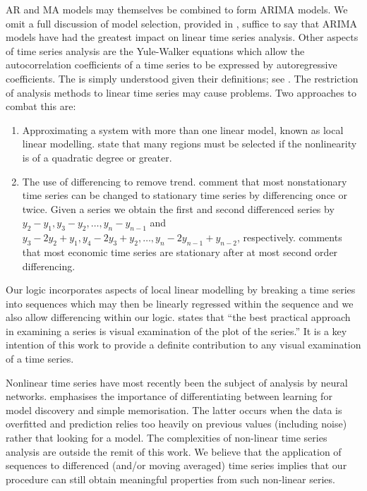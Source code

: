 \medskip

AR and MA models may themselves be combined to form ARIMA models.
We omit a full discussion of model selection,
provided in
\cite{ko90,end95}, suffice to say that ARIMA models have had the
greatest impact on linear time series analysis. Other aspects of time
series analysis are the Yule-Walker equations which allow the
autocorrelation coefficients of a time series to be expressed by
autoregressive coefficients. The is simply understood given their
definitions; see \cite{ko90}. The restriction of analysis methods to
linear time series may cause problems. Two approaches to combat this
are:
\begin{enumerate}
\item Approximating a system with more than one linear model, known as
local linear modelling. \cite{wg94} state that many regions must be
selected if the nonlinearity is of a quadratic degree or greater.
\item The use of differencing to remove trend. \cite{naze88,end95}
comment that most nonstationary time series can be changed to
stationary time series by differencing once or twice. Given a series
 we obtain the first and second differenced series by 
$y_2 - y_1, y_3 - y_2, \ldots, y_n - y_{n-1}$ and 
$y_3 - 2y_2 + y_1, y_4 - 2y_3 + y_2, \ldots, y_n - 2y_{n-1} +
y_{n-2}$, respectively. \cite{naze88} comments that most economic time
series are stationary after at most second order differencing.
\end{enumerate}

Our logic incorporates aspects of local linear modelling by breaking a
time series into sequences which may then be linearly regressed within
the sequence and we also allow differencing within our
logic. \cite{naze88} states that ``the best practical approach in
examining a series is visual examination of the plot of the series.''
It is a key intention of this work to provide a definite contribution
to any visual examination of a time series.  

\medskip

Nonlinear time series have most recently been the subject of analysis
by neural networks. \cite{wg94} emphasises the importance of
differentiating between learning for model discovery and simple
memorisation. The latter occurs when the data is overfitted and
prediction relies too heavily on previous values (including noise)
rather that looking for a model. The complexities of non-linear time
series analysis are outside the remit of this work. We believe that
the application of sequences to differenced (and/or moving averaged)
time series implies that our
procedure can still obtain meaningful properties from such non-linear series.

